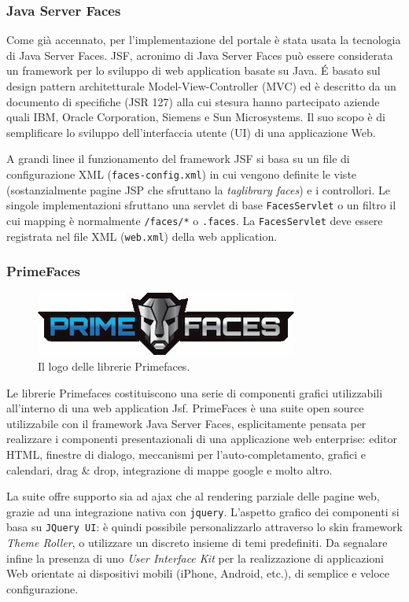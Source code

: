 \documentclass{article}
\begin{document}
\subsubsection*{Java Server Faces}
Come già accennato, per l'implementazione del portale è stata usata la tecnologia di Java Server Faces. JSF, acronimo di Java Server Faces può essere considerata un framework per lo sviluppo di web application basate su Java. \'E basato sul design pattern architetturale Model-View-Controller (MVC) ed è descritto da un documento di specifiche (JSR 127) alla cui stesura hanno partecipato aziende quali IBM, Oracle Corporation, Siemens e Sun Microsystems. Il suo scopo è di semplificare lo sviluppo dell'interfaccia utente (UI) di una applicazione Web.
\par A grandi linee il funzionamento del framework JSF si basa su un file di configurazione XML ({\tt faces-config.xml}) in cui vengono definite le viste (sostanzialmente pagine JSP che sfruttano la \emph{taglibrary faces}) e i controllori. Le singole implementazioni sfruttano una servlet di base {\tt FacesServlet} o un filtro il cui mapping è normalmente {\tt /faces/*} o {\tt *.faces}. La {\tt FacesServlet} deve essere registrata nel file XML ({\tt web.xml}) della web application.
\subsubsection*{PrimeFaces}
\begin{figure}[h!]
\centering
\includegraphics[width=.5\textwidth]{img/prime}
\caption{Il logo delle librerie Primefaces.}
\end{figure}
Le librerie Primefaces costituiscono una serie di componenti grafici utilizzabili all'interno di una web application Jsf.
PrimeFaces è una suite open source utilizzabile con il framework Java Server Faces, esplicitamente pensata per realizzare i componenti presentazionali di una applicazione web enterprise: editor HTML, finestre di dialogo, meccanismi per l'auto-completamento, grafici e calendari, drag \& drop, integrazione di mappe google e molto altro.
\par La suite offre supporto sia ad ajax che al rendering parziale delle pagine web, grazie ad una integrazione nativa con {\tt jquery}. L'aspetto grafico dei componenti si basa su {\tt JQuery UI}: è quindi possibile personalizzarlo attraverso lo skin framework \emph{Theme Roller}, o utilizzare un discreto insieme di temi predefiniti. Da segnalare infine la presenza di uno \emph{User Interface Kit} per la realizzazione di applicazioni Web orientate ai dispositivi mobili (iPhone, Android, etc.), di semplice e veloce configurazione.
\end{document}
